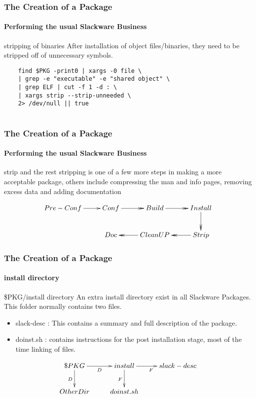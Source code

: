 \documentclass[12pt,hyperref={pdfpagelabels=true}]{beamer}
\begin{document}
\begin{frame}[fragile]
  \frametitle{The Creation of a Package}
  \framesubtitle{Performing the usual Slackware Business}
  \begin{block}{stripping of binaries}
    After installation of object files/binaries, they need to be stripped off of
    unnecessary symbols.
  \end{block}
  
  \pause
  
  \begin{lstlisting}
    find $PKG -print0 | xargs -0 file \
    | grep -e "executable" -e "shared object" \
    | grep ELF | cut -f 1 -d : \
    | xargs strip --strip-unneeded \
    2> /dev/null || true
    
  \end{lstlisting}
  
\end{frame}

\begin{frame}
  \frametitle{The Creation of a Package}
  \framesubtitle{Performing the usual Slackware Business}
  
  \begin{block}{strip and the rest}
    stripping is one of a few more steps in making a more acceptable package,
    others include compressing the man and info pages, removing excess data and
    adding documentation
  \end{block}
  
  \pause
  
  \begin{equation*}
    \xymatrix@C=2pc@R=2pc{
      Pre-Conf\ar@{->}[r] & Conf\ar@{->>}[r] &
      Build\ar@{->>}[r] & Install\ar@{->>}[d]\\
      & Doc & CleanUP\ar@{->>}[l] & Strip\ar@{->>}[l]}
  \end{equation*}
  
\end{frame}

\begin{frame}[fragile]
  \frametitle{The Creation of a Package}
  \framesubtitle{install directory}
  \begin{block}{\$PKG/install directory}
    An extra install directory exist in all Slackware Packages.
    This folder normally contains two files.
    \begin{itemize}[<+-| alert@+>]
    \item slack-desc : This contains a summary and full description of the
      package.
    \item doinst.sh : contains instructions for the post installation stage,
      most of the time linking of files.
    \end{itemize}
  \end{block}

  \pause
  
  \begin{equation*}
    \xymatrix@C=2pc@R=2pc{
      \$PKG\/\ar[r]_D\ar[d]_D & install\ar[r]_F\ar[d]_F & slack-desc\\
      OtherDir  & doinst.sh  }
  \end{equation*}
\end{frame}
\end{document}
